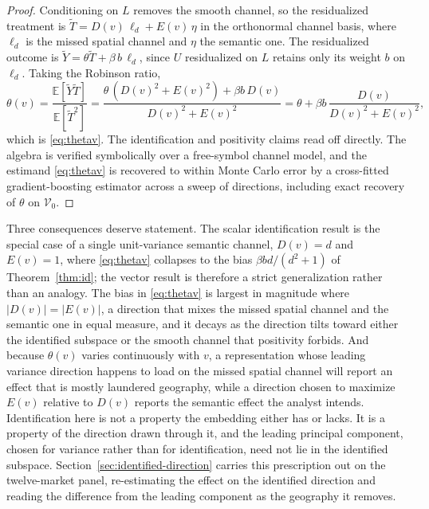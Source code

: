 \begin{proof}[Proof]
Conditioning on $L$ removes the smooth channel, so the residualized treatment is
$\tilde T=D(v)\,\ell_d+E(v)\,\eta$ in the orthonormal channel basis, where $\ell_d$
is the missed spatial channel and $\eta$ the semantic one. The residualized
outcome is $\tilde Y=\theta\tilde T+\beta\,b\,\ell_d$, since $U$ residualized on
$L$ retains only its weight $b$ on $\ell_d$. Taking the Robinson ratio,
\[
\theta(v)=\frac{\mathbb{E}[\tilde Y\tilde T]}{\mathbb{E}[\tilde T^2]}
=\frac{\theta\,(D(v)^2+E(v)^2)+\beta b\,D(v)}{D(v)^2+E(v)^2}
=\theta+\beta b\,\frac{D(v)}{D(v)^2+E(v)^2},
\]
which is \eqref{eq:thetav}. The identification and positivity claims read off
directly. The algebra is verified symbolically over a free-symbol channel model,
and the estimand \eqref{eq:thetav} is recovered to within Monte Carlo error by a
cross-fitted gradient-boosting estimator across a sweep of directions, including
exact recovery of $\theta$ on $\mathcal{V}_0$.
\end{proof}

Three consequences deserve statement. The scalar identification result is the
special case of a single unit-variance semantic channel, $D(v)=d$ and $E(v)=1$,
where \eqref{eq:thetav} collapses to the bias $\beta bd/(d^2+1)$ of
Theorem~\ref{thm:id}; the vector result is therefore a strict generalization
rather than an analogy. The bias in \eqref{eq:thetav} is largest in magnitude
where $|D(v)|=|E(v)|$, a direction that mixes the missed spatial channel and the
semantic one in equal measure, and it decays as the direction tilts toward either
the identified subspace or the smooth channel that positivity forbids. And because
$\theta(v)$ varies continuously with $v$, a representation whose leading variance
direction happens to load on the missed spatial channel will report an effect that
is mostly laundered geography, while a direction chosen to maximize $E(v)$ relative
to $D(v)$ reports the semantic effect the analyst intends. Identification here is
not a property the embedding either has or lacks. It is a property of the direction
drawn through it, and the leading principal component, chosen for variance rather
than for identification, need not lie in the identified subspace.
Section~\ref{sec:identified-direction} carries this prescription out on the
twelve-market panel, re-estimating the effect on the identified direction and
reading the difference from the leading component as the geography it removes.

